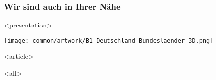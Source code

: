 
\begin{frame}[fragile]
\frametitle<presentation>{Wir sind auch in Ihrer Nähe}

 
\mode
<presentation>
\begin{center}
\texttt{[image: common/artwork/B1\_Deutschland\_Bundeslaender\_3D.png]}
\end{center}

\mode
<article>

\mode
<all>

\end{frame}
\newpage

\clearpage

